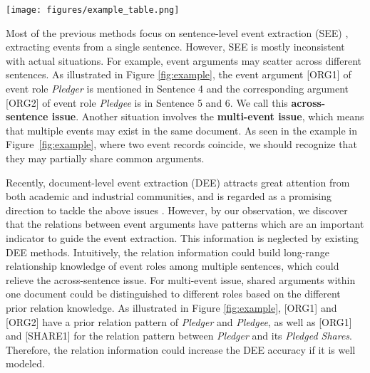 \documentclass[11pt]{article}
\begin{document}
\begin{figure*}
    \centering
    \texttt{[image: figures/example\_table.png]}
    \caption{An example document for the event type of Equity Pledge, including selected sentences that are involved in multiple event records and where the event arguments scatter across sentences. We can observe that the relations between these entity mentions have intuitive patterns that could be leveraged to enhance the event extraction task. More information of entity color and complete event-related relations can be found in Appendix \ref{section:A.2}.}
    \label{fig:example}
\end{figure*}
Most of the previous methods focus on sentence-level event extraction (SEE) \citep{David-see,Shasha-see,Qi-see,Yubo-see,Thien-see,Yue-see,Lei-see,Haoran-see,Xinya-see,Fayuan-see,Giovanni-see,Yaojie-see}, extracting events from a single sentence. However, SEE is mostly inconsistent with actual situations. For example, event arguments may scatter across different sentences. As illustrated in Figure \ref{fig:example}, the event argument [ORG1] of event role \textit{Pledger} is mentioned in Sentence 4 and the corresponding argument [ORG2] of event role \textit{Pledgee} is in Sentence 5 and 6. We call this \textbf{across-sentence issue}. Another situation involves the \textbf{multi-event issue}, which means that multiple events may exist in the same document. As seen in the example in Figure~\ref{fig:example}, where two event records coincide, we should recognize that they may partially share common arguments.

Recently, document-level event extraction (DEE) attracts great attention from both academic and industrial communities, and is regarded as a promising direction to tackle the above issues \citep{DCFEE,Doc2EDAG,GIT,DE-PPN,PTPCG}. However, by our observation, we discover that the relations between event arguments have patterns which are an important indicator to guide the event extraction. This information is neglected by existing DEE methods. Intuitively, the relation information could build long-range relationship knowledge of event roles among multiple sentences, which could relieve the across-sentence issue. For multi-event issue, shared arguments within one document could be distinguished to different roles based on the different prior relation knowledge. As illustrated in Figure \ref{fig:example}, [ORG1] and [ORG2] have a prior relation pattern of \textit{Pledger} and \textit{Pledgee}, as well as [ORG1] and [SHARE1] for the relation pattern between \textit{Pledger} and its \textit{Pledged Shares}. Therefore, the relation information could increase the DEE accuracy if it is well modeled.
\end{document}
